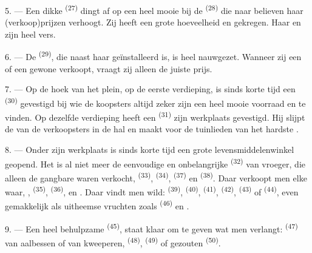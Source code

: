 5. --- Een dikke  \textsuperscript{(27)} dingt af op een heel mooie
 bij de  \textsuperscript{(28)} die naar
believen haar (verkoop)prijzen verhoogt. Zij heeft een grote hoeveelheid
 en  gekregen. Haar
 en  zijn heel vers.

\VUsaut{4.0mm}
\VUsaut{3.0mm}

6. --- De  \textsuperscript{(29)}, die naast haar geïnstalleerd is, is
heel nauwgezet. Wanneer zij een  of een gewone
 verkoopt, vraagt zij alleen de juiste prijs.

7. --- Op de hoek van het plein, op de eerste verdieping, is sinds korte tijd een
 \textsuperscript{(30)} gevestigd bij wie de koopsters
altijd zeker zijn een heel mooie voorraad  en
 te vinden. Op dezelfde verdieping heeft een
 \textsuperscript{(31)} zijn werkplaats gevestigd. Hij
slijpt de  van de verkoopsters in de hal en maakt voor de tuinlieden
 van het hardste .

\VUsaut{4.0mm}
\VUsaut{3.0mm}

8. --- Onder zijn werkplaats is sinds korte tijd een grote levensmiddelenwinkel geopend. Het
is al niet meer de eenvoudige en onbelangrijke
 \textsuperscript{(32)} van vroeger, die alleen de
gangbare waren verkocht,  \textsuperscript{(33)},
 \textsuperscript{(34)}, 
\textsuperscript{(37)} en  \textsuperscript{(38)}. Daar verkoopt men elke waar,
,  \textsuperscript{(35)}, 
\textsuperscript{(36)},
 en . Daar vindt men
wild:  \textsuperscript{(39)},  \textsuperscript{(40)},
 \textsuperscript{(41)},
 \textsuperscript{(42)}, 
\textsuperscript{(43)} of  \textsuperscript{(44)}, even gemakkelijk als
uitheemse vruchten zoals  \textsuperscript{(46)} en .

9. --- Een heel behulpzame  \textsuperscript{(45)}, staat klaar om
te geven wat men verlangt:  \textsuperscript{(47)} van aalbessen of van kweeperen,
 \textsuperscript{(48)},
 \textsuperscript{(49)} of gezouten 
\textsuperscript{(50)}.

